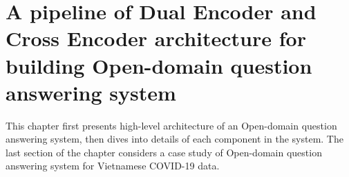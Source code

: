 \documentclass[12pt, sort&compress]{report}
\begin{document}
\chapter{A pipeline of Dual Encoder and Cross Encoder architecture for building Open-domain question answering system}
\label{chap:03}
\setcounter{section}{0}
This chapter first presents high-level architecture of an Open-domain question answering system, then dives into details of each component in the system. The last section of the chapter considers a case study of Open-domain question answering system for Vietnamese COVID-19 data.
\end{document}
